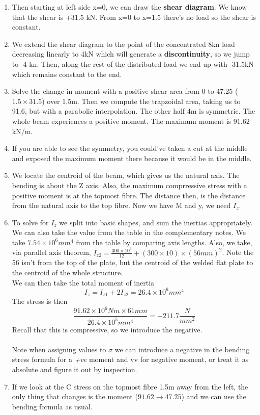 \documentclass[10pt, twocolumn]{report}
\begin{document}
\begin{enumerate}
  \item Then starting at left side x=0, we can draw the \textbf{shear diagram}. We know that the shear is +31.5 kN. From x=0 to x=1.5 there's no load so the shear is constant.
  \item We extend the shear diagram to the point of the concentrated 8kn load decreasing linearly to 4kN which will generate a \textbf{discontinuity}, so we jump to -4 kn. Then, along the rest of  the distributed load we end up with -31.5kN which remains constant to the end.
  \item Solve the change in moment with a positive shear area from 0 to 47.25 ($1.5 \times 31.5$) over 1.5m. Then we compute the trapzoidal area, taking us to 91.6, but with a parabolic interpolation. The other half 4m is symmetric. The whole beam experiences a positive moment. The maximum moment is $91.62$ kN/m.
  \item If you are able to see the symmetry, you could've taken a cut at the middle and exposed the maximum moment there because it would be in the middle.
  \item We locate the centroid of the beam, which gives us the natural axis. The bending is about the Z axis. Also, the maximum comprressive stress with a positive moment is at the topmost fibre. The distance then, is the distance from the natural axis to the top fibre. Now we have M and y, we need $I_z$.
  \item To solve for $I_z$ we split into basic shapes, and sum the inertias appropriately. We can also take the value from the table in the complementary notes. We take $7.54 \times 10^6 mm^4$ from the table by comparing axis lengths. Also, we take, via parallel axis theorem, $I_{z2} = \frac{300 \times 10^3}{12} + (300\times10)\times (56mm)^2$. Note the 56 isn't from the top of the plate, but the centroid of the welded flat plate to the centroid of the whole structure. \\ We can then take the total moment of inertia $$I_z = I_{z1} + 2I_{z2} = 26.4\times 10^6 mm^4$$ The stress is then $$\frac{91.62\times 10^6 Nm \times 61mm}{26.4 \times10^5 mm^4} = -211.7 \frac{N}{mm^2}$$ Recall that this is compressive, so we introduce the negative. \\\\ Note when assigning values to $\sigma$ we can introduce a negative in the bending stress formula for a \textit{+ve} moment and vv for negative moment, or treat it as absolute and figure it out by inspection.
  \item If we look at the C stress on the topmost fibre 1.5m away from the left, the only thing that changes is the moment ($91.62 \to 47.25$) and we can use the bending formula as usual.
\end{enumerate}
\end{document}
